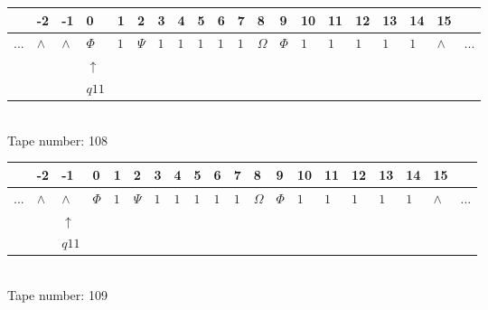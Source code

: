 \documentclass[11pt]{article}
\begin{document}
\begin{table}[H]
\centering
\begin{tabular}{llllllllllllllllllll}
 & -2 & -1 & 0 & 1 & 2 & 3 & 4 & 5 & 6 & 7 & 8 & 9 & 10 & 11 & 12 & 13 & 14 & 15 & \\
\hline
$...$ & \multicolumn{1}{|l|}{$\wedge$} & \multicolumn{1}{|l|}{$\wedge$} & \multicolumn{1}{|l|}{$\Phi$} & \multicolumn{1}{|l|}{$1$} & \multicolumn{1}{|l|}{$\Psi$} & \multicolumn{1}{|l|}{$1$} & \multicolumn{1}{|l|}{$1$} & \multicolumn{1}{|l|}{$1$} & \multicolumn{1}{|l|}{$1$} & \multicolumn{1}{|l|}{$1$} & \multicolumn{1}{|l|}{$\Omega$} & \multicolumn{1}{|l|}{$\Phi$} & \multicolumn{1}{|l|}{$1$} & \multicolumn{1}{|l|}{$1$} & \multicolumn{1}{|l|}{$1$} & \multicolumn{1}{|l|}{$1$} & \multicolumn{1}{|l|}{$1$} & \multicolumn{1}{|l|}{$\wedge$} & $...$\\
\hline
&  &  & $\uparrow$ &  &  &  &  &  &  &  &  &  &  &  &  &  &  &  &  \\
&  &  & $ q11 $ &  &  &  &  &  &  &  &  &  &  &  &  &  &  &  &  \\
\end{tabular}
\\
Tape number: 108
\noindent\makebox[\linewidth]{\hdashrule{\textwidth}{1pt}{1pt}}\end{table}

\begin{table}[H]
\centering
\begin{tabular}{llllllllllllllllllll}
 & -2 & -1 & 0 & 1 & 2 & 3 & 4 & 5 & 6 & 7 & 8 & 9 & 10 & 11 & 12 & 13 & 14 & 15 & \\
\hline
$...$ & \multicolumn{1}{|l|}{$\wedge$} & \multicolumn{1}{|l|}{$\wedge$} & \multicolumn{1}{|l|}{$\Phi$} & \multicolumn{1}{|l|}{$1$} & \multicolumn{1}{|l|}{$\Psi$} & \multicolumn{1}{|l|}{$1$} & \multicolumn{1}{|l|}{$1$} & \multicolumn{1}{|l|}{$1$} & \multicolumn{1}{|l|}{$1$} & \multicolumn{1}{|l|}{$1$} & \multicolumn{1}{|l|}{$\Omega$} & \multicolumn{1}{|l|}{$\Phi$} & \multicolumn{1}{|l|}{$1$} & \multicolumn{1}{|l|}{$1$} & \multicolumn{1}{|l|}{$1$} & \multicolumn{1}{|l|}{$1$} & \multicolumn{1}{|l|}{$1$} & \multicolumn{1}{|l|}{$\wedge$} & $...$\\
\hline
&  & $\uparrow$ &  &  &  &  &  &  &  &  &  &  &  &  &  &  &  &  &  \\
&  & $ q11 $ &  &  &  &  &  &  &  &  &  &  &  &  &  &  &  &  &  \\
\end{tabular}
\\
Tape number: 109
\noindent\makebox[\linewidth]{\hdashrule{\textwidth}{1pt}{1pt}}\end{table}
\end{document}
